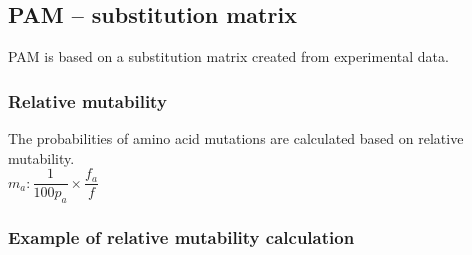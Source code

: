 %
%

%
%
\subsection{PAM – substitution matrix}
PAM is based on a substitution matrix created from experimental data.

%
%
\subsubsection*{Relative mutability}
The probabilities of amino acid mutations are calculated based on relative mutability. \\

$m_a : \dfrac{1}{100p_a} \times \dfrac{f_a}{f}$

%
%
\subsubsection*{Example of relative mutability calculation}

